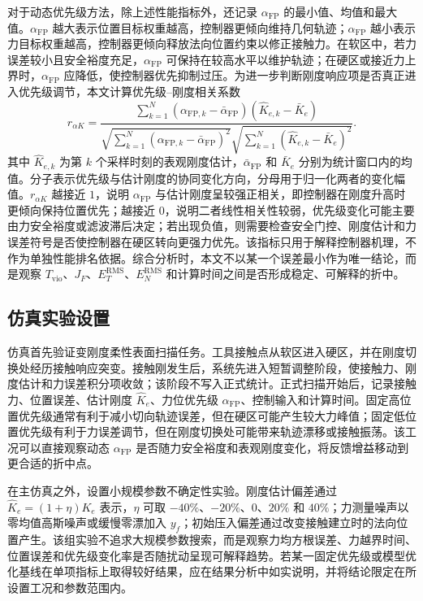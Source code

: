 对于动态优先级方法，除上述性能指标外，还记录 $\alpha_{\mathrm{FP}}$ 的最小值、均值和最大值。$\alpha_{\mathrm{FP}}$ 越大表示位置目标权重越高，控制器更倾向维持几何轨迹；$\alpha_{\mathrm{FP}}$ 越小表示力目标权重越高，控制器更倾向释放法向位置约束以修正接触力。在软区中，若力误差较小且安全裕度充足，$\alpha_{\mathrm{FP}}$ 可保持在较高水平以维护轨迹；在硬区或接近力上界时，$\alpha_{\mathrm{FP}}$ 应降低，使控制器优先抑制过压。为进一步判断刚度响应项是否真正进入优先级调节，本文计算优先级--刚度相关系数
\begin{equation}
  r_{\alpha K}=
  \frac{\sum_{k=1}^{N}(\alpha_{\mathrm{FP},k}-\bar\alpha_{\mathrm{FP}})
  (\hat K_{e,k}-\bar K_e)}
  {\sqrt{\sum_{k=1}^{N}(\alpha_{\mathrm{FP},k}-\bar\alpha_{\mathrm{FP}})^2}
  \sqrt{\sum_{k=1}^{N}(\hat K_{e,k}-\bar K_e)^2}} .
  \label{eq:ch3_metric_alpha_k_corr}
\end{equation}
其中 $\hat K_{e,k}$ 为第 $k$ 个采样时刻的表观刚度估计，$\bar\alpha_{\mathrm{FP}}$ 和 $\bar K_e$ 分别为统计窗口内的均值。分子表示优先级与估计刚度的协同变化方向，分母用于归一化两者的变化幅值。$r_{\alpha K}$ 越接近 $1$，说明 $\alpha_{\mathrm{FP}}$ 与估计刚度呈较强正相关，即控制器在刚度升高时更倾向保持位置优先；越接近 $0$，说明二者线性相关性较弱，优先级变化可能主要由力安全裕度或滤波滞后决定；若出现负值，则需要检查安全门控、刚度估计和力误差符号是否使控制器在硬区转向更强力优先。该指标只用于解释控制器机理，不作为单独性能排名依据。综合分析时，本文不以某一个误差最小作为唯一结论，而是观察 $T_{\mathrm{vio}}$、$J_F$、$E_T^{\mathrm{RMS}}$、$E_N^{\mathrm{RMS}}$ 和计算时间之间是否形成稳定、可解释的折中。

\subsection{仿真实验设置}
\label{subsec:ch3_sim_setup}

仿真首先验证变刚度柔性表面扫描任务。工具接触点从软区进入硬区，并在刚度切换处经历接触响应突变。接触刚发生后，系统先进入短暂调整阶段，使接触力、刚度估计和力误差积分项收敛；该阶段不写入正式统计。正式扫描开始后，记录接触力、位置误差、估计刚度 $\hat K_e$、力位优先级 $\alpha_{\mathrm{FP}}$、控制输入和计算时间。固定高位置优先级通常有利于减小切向轨迹误差，但在硬区可能产生较大力峰值；固定低位置优先级有利于力误差调节，但在刚度切换处可能带来轨迹漂移或接触振荡。该工况可以直接观察动态 $\alpha_{\mathrm{FP}}$ 是否随力安全裕度和表观刚度变化，将反馈增益移动到更合适的折中点。

在主仿真之外，设置小规模参数不确定性实验。刚度估计偏差通过 $\hat K_e=(1+\eta)K_e$ 表示，$\eta$ 可取 $-40\%$、$-20\%$、$0$、$20\%$ 和 $40\%$；力测量噪声以零均值高斯噪声或缓慢零漂加入 $y_f$；初始压入偏差通过改变接触建立时的法向位置产生。该组实验不追求大规模参数搜索，而是观察力均方根误差、力越界时间、位置误差和优先级变化率是否随扰动呈现可解释趋势。若某一固定优先级或模型优化基线在单项指标上取得较好结果，应在结果分析中如实说明，并将结论限定在所设置工况和参数范围内。

